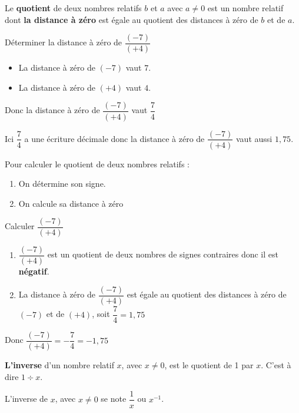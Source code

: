 \begin{propriete}
  Le \textbf{quotient} de deux nombres relatifs $b$ et $a$ avec $a\not=0$ est un nombre relatif 
  dont \textbf{la distance à zéro} est égale au quotient des distances à zéro de $b$ et de $a$.
\end{propriete}

\begin{exemple*1}
  Déterminer la distance à zéro de $\dfrac{(-7)}{(+4)}$
  \correction  
  \begin{itemize}
    \item La distance à zéro de $(-7)$ vaut $7$.
    \item La distance à zéro de $(+4)$ vaut $4$.
  \end{itemize}  
  Donc la distance à zéro de $\dfrac{(-7)}{(+4)}$ vaut $\dfrac{7}{4}$

  Ici $\dfrac{7}{4}$ a une écriture décimale donc la distance à zéro de $\dfrac{(-7)}{(+4)}$ vaut aussi $1,75$.
\end{exemple*1}

\begin{methode*1}
  Pour calculer le quotient de deux nombres relatifs :
  \begin{enumerate}
    \item On détermine son signe.
    \item On calcule sa distance à zéro
  \end{enumerate}
  \exercice
  Calculer $\dfrac{(-7)}{(+4)}$
  \correction
  \begin{enumerate}
    \item $\dfrac{(-7)}{(+4)}$ est un quotient de deux nombres de signes contraires donc il est \textbf{négatif}.
    \item La distance à zéro de $\dfrac{(-7)}{(+4)}$ est égale au quotient des distances à zéro de $(-7)$ et de $(+4)$,
    soit $\dfrac{7}{4} = 1,75$
  \end{enumerate}
  Donc $\dfrac{(-7)}{(+4)} = -\dfrac{7}{4} = -1,75$
\end{methode*1}

\begin{definition}
  \textbf{L'inverse} d'un nombre relatif $x$, avec $x\not=0$, est le quotient de 1 par $x$. C'est à dire $1\div x$.
\end{definition}

\begin{notation}
  L'inverse de $x$, avec $x\not=0$ se note $\dfrac{1}{x}$ ou $x^{-1}$.
\end{notation} 

